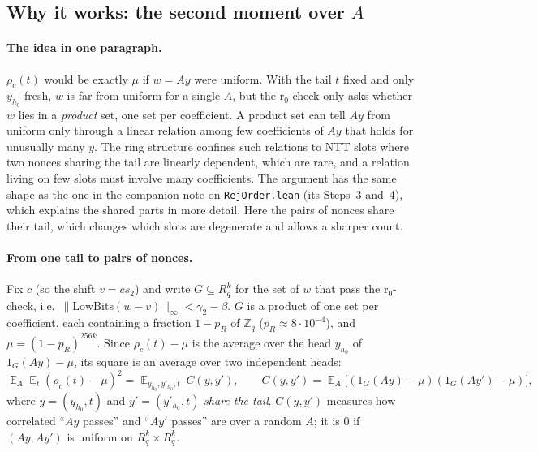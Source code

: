 \documentclass[11pt]{article}
\theoremstyle{definition}
\theoremstyle{remark}
\newcommand{\Z}{\mathbb{Z}}
\newcommand{\lean}[1]{\texttt{#1}}
\begin{document}
\subsection{Why it works: the second moment over $A$}

\paragraph{The idea in one paragraph.}
$\rho_c(t)$ would be exactly $\mu$ if $w = Ay$ were uniform. With the tail $t$ fixed and only
$y_{h_0}$ fresh, $w$ is far from uniform for a single $A$, but the r$_0$-check only asks whether
$w$ lies in a \emph{product} set, one set per coefficient. A product set can tell $Ay$ from
uniform only through a linear relation among few coefficients of $Ay$ that holds for unusually
many $y$. The ring structure confines such relations to NTT slots where two nonces sharing the
tail are linearly dependent, which are rare, and a relation living on few slots must involve many
coefficients. The argument has the same shape as the one in the companion note on
\lean{RejOrder.lean} (its Steps~3 and~4), which explains the shared parts in more detail. Here
the pairs of nonces share their tail, which changes which slots are degenerate and allows a
sharper count.

\paragraph{From one tail to pairs of nonces.}
Fix $c$ (so the shift $v = c s_2$) and write $G \subseteq R_q^k$ for the set of $w$ that pass the
r$_0$-check, i.e.\ $\|\mathrm{LowBits}(w - v)\|_\infty < \gamma_2-\beta$. $G$ is a product of one
set per coefficient, each containing a fraction $1 - p_R$ of $\Z_q$
($p_R\approx 8\cdot10^{-4}$), and $\mu = (1-p_R)^{256k}$. Since
$\rho_c(t) - \mu$ is the average over the head $y_{h_0}$ of $1_G(Ay)-\mu$, its square is an
average over two independent heads:
\[
  \mathop{\mathbb E}_A \mathop{\mathbb E}_t (\rho_c(t) - \mu)^2
  = \mathop{\mathbb E}_{y_{h_0}, y'_{h_0}, t}\ C(y,y'),
  \qquad C(y,y') = \mathop{\mathbb E}_A
    \big[(1_G(Ay) - \mu)(1_G(Ay') - \mu)\big],
\]
where $y = (y_{h_0}, t)$ and $y' = (y'_{h_0}, t)$ \emph{share the tail}. $C(y,y')$ measures how
correlated ``$Ay$ passes'' and ``$Ay'$ passes'' are over a random $A$; it is $0$ if $(Ay,Ay')$ is
uniform on $R_q^k\times R_q^k$.
\end{document}
